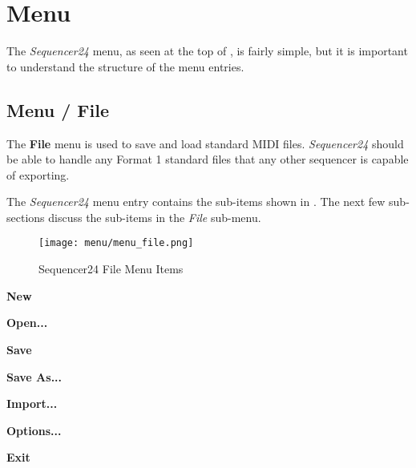 %
%
%

\section{Menu}
\label{sec:seq24_menu}

   The \textsl{Sequencer24} menu, as seen at the top of
   ,
   is fairly simple, but it is important to understand the
   structure of the menu entries.

\subsection{Menu / File}
\label{subsec:seq24_menu_file}

   The \textbf{File} menu is used to save and load standard MIDI files.
   \textsl{Sequencer24}
   should be able to handle any Format 1 standard files that any other
   sequencer is capable of exporting.  

   The \textsl{Sequencer24} menu entry contains the sub-items shown in
   .  The next few sub-sections discuss
   the sub-items in the \textsl{File} sub-menu.

\begin{figure}[H]
   \centering 
   \texttt{[image: menu/menu\_file.png]}
   \caption{Sequencer24 File Menu Items}
   \label{fig:seq24_menu_file_items}
\end{figure}

   \begin{enumber}
      \item \textbf{New}
      \item \textbf{Open...}
      \item \textbf{Save}
      \item \textbf{Save As...}
      \item \textbf{Import...}
      \item \textbf{Options...}
      \item \textbf{Exit}
   \end{enumber}

